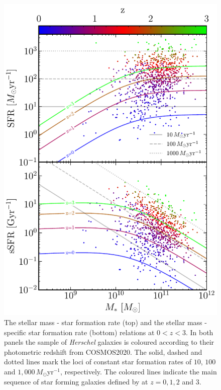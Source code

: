 \begin{figure}
	\centering
	\includegraphics[width=0.8\columnwidth]{Figures/star_formation_ms.pdf}
	\caption[The $M_*$-SFR and $M_*$-sSFR planes of \textit{Herschel} galaxies between $0 < z < 3$]{The stellar mass - star formation rate (top) and the stellar mass - specific star formation rate (bottom) relations at $0 < z < 3$. In both panels the sample of \textit{Herschel} galaxies is coloured according to their photometric redshift from COSMOS2020. The solid, dashed and dotted lines mark the loci of constant star formation rates of $10$, $100$ and $1,000\,M_\odot$yr$^{-1}$, respectively. The coloured lines indicate the main sequence of star forming galaxies defined by \citealt{Scoville_2017} at $z = 0, 1, 2$ and $3$.}
	\label{fig:star_formation_ms}
\end{figure}

